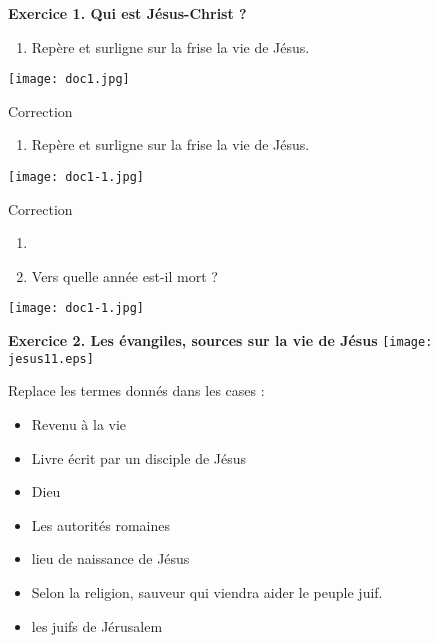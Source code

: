 \documentclass{beamer}
\begin{document}
 \begin{frame}\textbf{ Exercice 1. Qui est Jésus-Christ ?}
 \begin{enumerate}
 \item Repère et surligne sur la frise la vie de Jésus. 
 \end{enumerate}
 
 \texttt{[image: doc1.jpg]}
 \end{frame}
 
  \begin{frame} Correction
  \begin{enumerate}
  \item Repère et surligne sur la frise la vie de Jésus. 
  \end{enumerate}
  
  \texttt{[image: doc1-1.jpg]}
  \end{frame}
  
  \begin{frame} Correction
    \begin{enumerate}
    \item %
   \item Vers quelle année est-il mort ? %
    \end{enumerate}
    
    \texttt{[image: doc1-1.jpg]}
    \end{frame}
 
    
 \begin{frame} \textbf{Exercice 2. Les évangiles, sources sur la vie de Jésus}
 \texttt{[image: jesus11.eps]} \\
 \end{frame}
   
   
  \begin{frame}
  Replace les termes donnés dans les cases : \\
   \begin{minipage}{5cm}
   \begin{itemize}
   \item Revenu à la vie
   \item Livre écrit par un disciple de Jésus
   \item Dieu
   \item Les autorités romaines
   \end{itemize}
   \end{minipage}
   \begin{minipage}{5cm}
   \begin{itemize}
   \item lieu de naissance de Jésus
   \item Selon la religion, sauveur qui viendra aider le peuple juif.
   \item les juifs de Jérusalem \\
   \end{itemize}
   \end{minipage}
   \end{frame}
   
\end{document}
